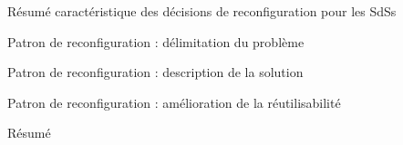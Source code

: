 \begin{frame}{Résumé caractéristique des décisions de reconfiguration
pour les SdSs}
\begin{table}[]
\centering
{}
\end{table}
\end{frame}


\begin{frame}{Patron de reconfiguration : délimitation du problème}
\end{frame}

\begin{frame}{Patron de reconfiguration : description de la solution}
\end{frame}


\begin{frame}{Patron de reconfiguration : amélioration de la
réutilisabilité}
\end{frame}

\begin{frame}{Résumé}
\end{frame}
